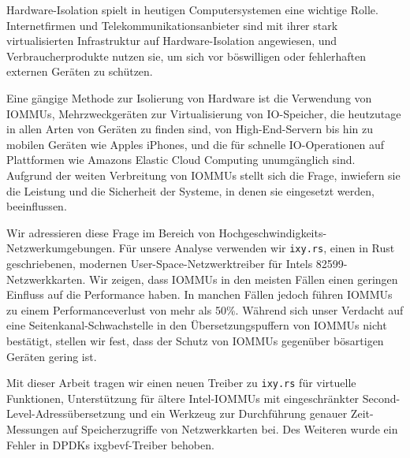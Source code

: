 \small

Hardware-Isolation spielt in heutigen Computersystemen eine wichtige Rolle.
Internetfirmen und Telekommunikationsanbieter sind mit ihrer stark
virtualisierten Infrastruktur auf Hardware-Isolation angewiesen, und
Verbraucherprodukte nutzen sie, um sich vor böswilligen oder fehlerhaften
externen Geräten zu schützen.

Eine gängige Methode zur Isolierung von Hardware ist die Verwendung von IOMMUs,
Mehrzweckgeräten zur Virtualisierung von IO-Speicher, die heutzutage in allen
Arten von Geräten zu finden sind, von High-End-Servern bis hin zu mobilen
Geräten wie Apples iPhones, und die für schnelle IO-Operationen auf Plattformen
wie Amazons Elastic Cloud Computing unumgänglich sind. Aufgrund der weiten
Verbreitung von IOMMUs stellt sich die Frage, inwiefern sie die Leistung und die
Sicherheit der Systeme, in denen sie eingesetzt werden, beeinflussen.

Wir adressieren diese Frage im Bereich von
Hochgeschwindigkeits-Netzwerkumgebungen. Für unsere Analyse verwenden wir
\texttt{ixy.rs}, einen in Rust geschriebenen, modernen
User-Space-Netzwerktreiber für Intels 82599-Netzwerkkarten. Wir zeigen, dass
IOMMUs in den meisten Fällen einen geringen Einfluss auf die Performance haben.
In manchen Fällen jedoch führen IOMMUs zu einem Performanceverlust von mehr als
50\%. Während sich unser Verdacht auf eine Seitenkanal-Schwachstelle in den
Übersetzungspuffern von IOMMUs nicht bestätigt, stellen wir fest, dass der
Schutz von IOMMUs gegenüber bösartigen Geräten gering ist.

Mit dieser Arbeit tragen wir einen neuen Treiber zu \texttt{ixy.rs} für
virtuelle Funktionen, Unterstützung für ältere Intel-IOMMUs mit eingeschränkter
Second-Level-Adressübersetzung und ein Werkzeug zur Durchführung genauer
Zeit-Messungen auf Speicherzugriffe von Netzwerkkarten bei. Des Weiteren wurde
ein Fehler in DPDKs ixgbevf-Treiber behoben.

